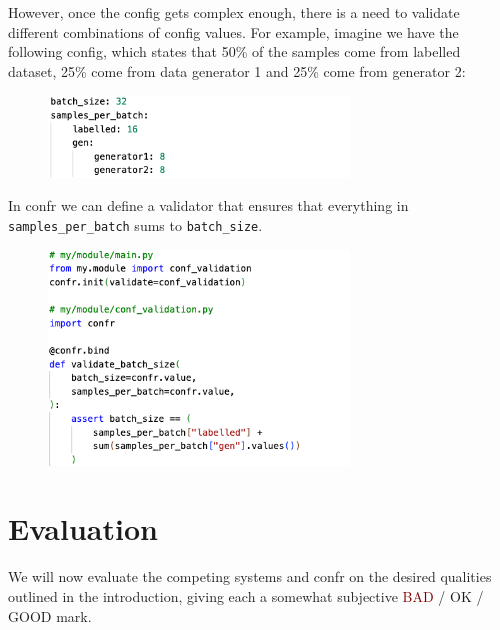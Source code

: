 \documentclass{itatnew}
\begin{document}
However, once the config gets complex enough, there is a need to validate different combinations of config values. For example, imagine we have the following config, which states that 50\% of the samples come from labelled dataset, 25\% come from data generator 1 and 25\% come from generator 2:

\begin{figure}[H]
    \centering
    \includegraphics[width=8cm]{c17.png}
\end{figure}

In confr we can define a validator that ensures that everything in \texttt{samples_per_batch} sums to \texttt{batch_size}.

\begin{figure}[H]
    \centering
    \includegraphics[width=8cm]{c18.png}
\end{figure}


\section{Evaluation}

We will now evaluate the competing systems and confr on the desired qualities outlined in the introduction, giving each a somewhat subjective \textcolor{Maroon}{BAD} / \textcolor{YellowOrange}{OK} / \textcolor{OliveGreen}{GOOD} mark.
\end{document}
